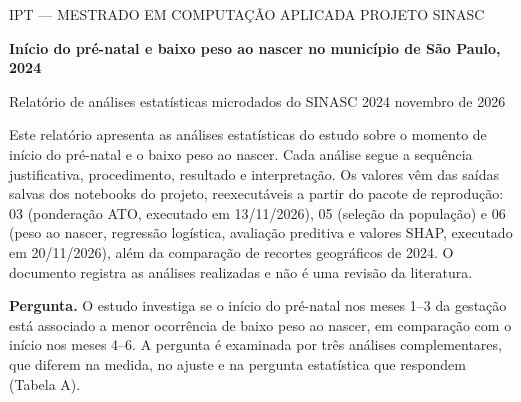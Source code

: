 \documentclass[10pt,a4paper]{article}
\newcommand{\secao}[2]{\par\needspace{6\baselineskip}\vspace{8pt}{\color{iptescuro}\bfseries\large{\color{iptazul}#1}~#2}\par
  \vspace{-2pt}{\color{iptgrade}\rule{\linewidth}{0.8pt}}\par\vspace{1pt}}
\begin{document}
\small

\begin{tcolorbox}[enhanced, colback=iptescuro, boxrule=0pt, frame hidden, sharp corners, borderline south={2.5pt}{0pt}{iptciano}, left=9pt, right=9pt, top=6pt, bottom=7pt]

{\color{white}\scriptsize IPT --- MESTRADO EM COMPUTAÇÃO APLICADA \textperiodcentered{} PROJETO SINASC}\par\vspace{2pt}

{\color{white}\bfseries\Large Início do pré-natal e baixo peso ao nascer no município de São Paulo, 2024}\par\vspace{2pt}

{\color{white}\footnotesize Relatório de análises estatísticas \textperiodcentered{} microdados do SINASC 2024 \textperiodcentered{} novembro de 2026}

\end{tcolorbox}

{\color{iptcinza}Este relatório apresenta as análises estatísticas do estudo sobre o momento de início do pré-natal e o baixo peso ao nascer. Cada análise segue a sequência justificativa, procedimento, resultado e interpretação. Os valores vêm das saídas salvas dos notebooks do projeto, reexecutáveis a partir do pacote de reprodução: 03 (ponderação ATO, executado em 13/11/2026), 05 (seleção da população) e 06 (peso ao nascer, regressão logística, avaliação preditiva e valores SHAP, executado em 20/11/2026), além da comparação de recortes geográficos de 2024. O documento registra as análises realizadas e não é uma revisão da literatura.\par}

\secao{1.}{Pergunta, dados e população}

{\color{iptescuro}\bfseries Pergunta.} O estudo investiga se o início do pré-natal nos meses 1--3 da gestação está associado a menor ocorrência de baixo peso ao nascer, em comparação com o início nos meses 4--6. A pergunta é examinada por três análises complementares, que diferem na medida, no ajuste e na pergunta estatística que respondem (Tabela A).\par
\end{document}

